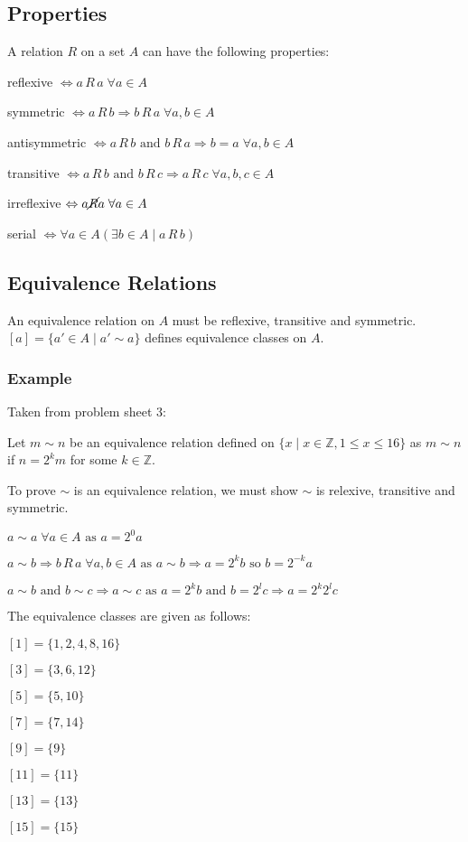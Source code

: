 \documentclass[10pt]{article}
\begin{document}
\subsection{Properties}
A relation $R$ on a set $A$ can have the following properties:
\begin{itemize*}
\item reflexive $\Leftrightarrow a\,R\,a\;\forall a\in A$
\item symmetric $\Leftrightarrow a\,R\,b\Rightarrow b\,R\,a \;\forall a,b\in A$
\item antisymmetric $\Leftrightarrow a\,R\,b\text{ and }b\,R\,a\Rightarrow b = a\;\forall a,b \in A$
\item transitive $\Leftrightarrow a\,R\,b\text{ and }b\,R\,c\Rightarrow a\,R\,c\;\forall a, b, c \in A$
\item irreflexive $\Leftrightarrow a\cancel{R}a\;\forall a\in A$
\item serial $\Leftrightarrow \forall a \in A\left(\exists b \in A \mid a\,R\,b\right)$
\end{itemize*}
\subsection{Equivalence Relations}
An equivalence relation on $A$ must be reflexive, transitive and symmetric.  $\left[a\right]=\{a'\in A\mid a'\sim a\}$ defines equivalence classes on $A$.
\subsubsection{Example}
Taken from problem sheet 3:

Let $m\sim n$ be an equivalence relation defined on $\{ x \mid x\in\mathbb Z,1\le x\le 16\}$ as $m\sim n$ if $n=2^km$ for some $k\in \mathbb Z$.

To prove $\sim$ is an equivalence relation, we must show $\sim$ is relexive, transitive and symmetric.

$a\sim a\;\forall a \in A \text{ as }a=2^0a$

$a\sim b\Rightarrow b\, R\, a \; \forall a,b \in A \text{ as } a\sim b\Rightarrow a=2^k b\text{ so } b=2^{-k}a$

$a\sim b\text{ and }b\sim c\Rightarrow a\sim c\text{ as }a=2^kb\text{ and }b=2^lc\Rightarrow a=2^k2^lc$

The equivalence classes are given as follows:
\begin{multicols}{2}
$\left[1\right]=\{1,2,4,8,16\}$

$\left[3\right]=\{3,6,12\}$

$\left[5\right]=\{5,10\}$

$\left[7\right]=\{7,14\}$

$\left[9\right]=\{9\}$

$\left[11\right]=\{11\}$

$\left[13\right]=\{13\}$

$\left[15\right]=\{15\}$
\end{multicols}
\end{document}
